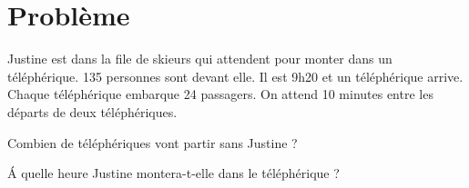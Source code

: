\section{Problème}

Justine est dans la file de skieurs qui attendent pour monter dans un téléphérique. 135 personnes sont devant elle. Il est 9h20 et un téléphérique arrive. Chaque téléphérique embarque 24 passagers. On attend 10 minutes entre les départs de deux téléphériques.

\begin{questions}
	\question Combien de téléphériques vont partir sans Justine ?
	
	\question \'A quelle heure Justine montera-t-elle dans le téléphérique ?
\end{questions}